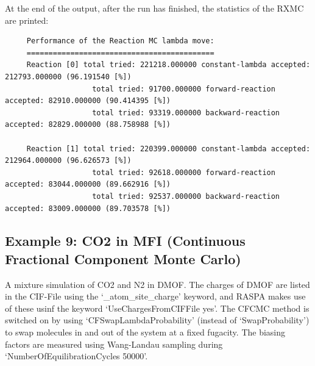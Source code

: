At the end of the output, after the run has finished, the statistics of the RXMC are printed:
\begin{tiny}
\begin{verbatim}
     Performance of the Reaction MC lambda move:
     ===========================================
     Reaction [0] total tried: 221218.000000 constant-lambda accepted: 212793.000000 (96.191540 [%])
                    total tried: 91700.000000 forward-reaction accepted: 82910.000000 (90.414395 [%])
                    total tried: 93319.000000 backward-reaction accepted: 82829.000000 (88.758988 [%])
     
     Reaction [1] total tried: 220399.000000 constant-lambda accepted: 212964.000000 (96.626573 [%])
                    total tried: 92618.000000 forward-reaction accepted: 83044.000000 (89.662916 [%])
                    total tried: 92537.000000 backward-reaction accepted: 83009.000000 (89.703578 [%])
\end{verbatim}
\end{tiny}

\subsection*{Example 9: CO2 in MFI (Continuous Fractional Component Monte Carlo)}

A mixture simulation of CO2 and N2 in DMOF. The charges of DMOF are listed in the CIF-File using the `\_atom\_site\_charge' keyword,
and RASPA makes use of these usinf the keyword `UseChargesFromCIFFile yes'.
The CFCMC method is switched on by using `CFSwapLambdaProbability' (instead of `SwapProbability') to swap molecules in and out of the system at a fixed fugacity.
The biasing factors are measured using Wang-Landau sampling during `NumberOfEquilibrationCycles 50000'.

